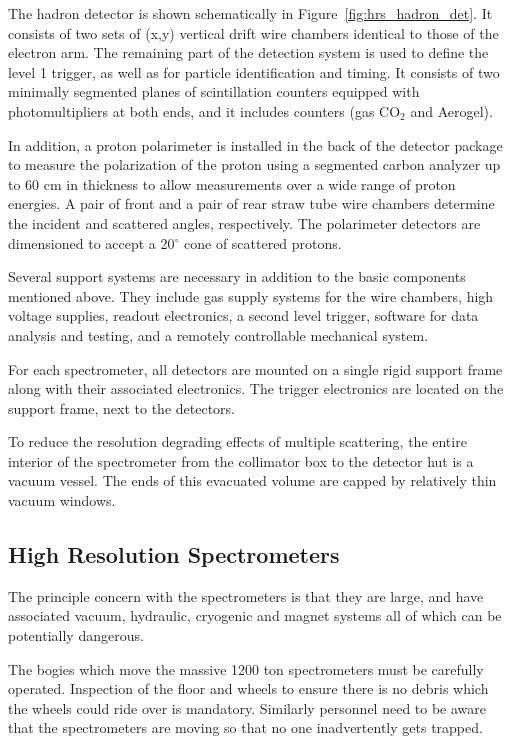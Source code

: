 {The hadron detector is shown schematically in 
Figure~\ref{fig:hrs_hadron_det}.  It consists 
of two sets of (x,y) vertical drift wire chambers identical to those of the 
electron arm.  The remaining part of the detection system is used to 
define the level 1 trigger, as well as for particle identification and 
timing.  It consists of two minimally segmented planes of 
scintillation counters equipped with photomultipliers at both ends, and 
it includes \Cherenkov{} counters (gas CO$_2$ and Aerogel).

In addition, a proton polarimeter is installed in the back of the 
detector package to measure the polarization of the proton using a 
segmented carbon analyzer up to 60 cm in thickness to allow measurements 
over a wide range of proton energies.  A pair of front and a pair of 
rear straw tube wire chambers determine the incident and 
scattered angles, respectively.  The 
polarimeter detectors are dimensioned to accept a 20$^{\circ}$ cone of 
scattered protons.

Several support systems are necessary in addition to the basic 
components mentioned above.  They include gas supply systems for the 
wire chambers, high voltage supplies, readout electronics, a second 
level trigger, software for data analysis and testing, and a remotely 
controllable mechanical system.

For each spectrometer, all detectors are mounted on a 
single rigid support frame along with their associated electronics.  The trigger electronics are located on the support frame, next to the detectors.

To reduce the resolution degrading effects of multiple scattering, the 
entire interior of the spectrometer from the collimator box to the detector hut 
is a vacuum vessel.  The ends of this evacuated volume are capped by 
relatively thin vacuum windows.
}

\begin{safetyen}{0}{0}
\section{High Resolution Spectrometers}
\label{sec:hrs-safety}
\end{safetyen}

The principle concern with the spectrometers is that they are large, 
and have associated vacuum, hydraulic, cryogenic and magnet systems all of 
which can be potentially dangerous.

The bogies which move the massive 1200 ton spectrometers must be 
carefully operated.  Inspection of the floor and wheels to ensure there is no 
debris which the wheels could ride over is mandatory.  Similarly 
personnel need to be aware that the spectrometers are moving so that no one 
inadvertently gets trapped.

